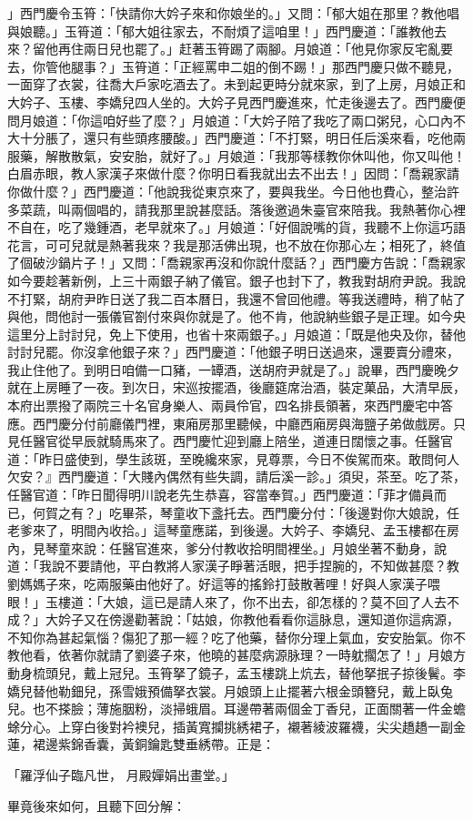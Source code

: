 \begin{showcontents}{}
」西門慶令玉筲：「快請你大妗子來和你娘坐的。」又問：「郁大姐在那里？教他唱與娘聽。」玉筲道：「郁大姐往家去，不耐煩了這咱里！」西門慶道：「誰教他去來？留他再住兩日兒也罷了。」赶著玉筲踢了兩腳。月娘道：「他見你家反宅亂要去，你管他腿事？」玉筲道：「正經罵申二姐的倒不踢！」那西門慶只做不聽見，一面穿了衣裳，往喬大戶家吃酒去了。未到起更時分就來家，到了上房，月娘正和大妗子、玉樓、李嬌兒四人坐的。大妗子見西門慶進來，忙走後邊去了。西門慶便問月娘道：「你這咱好些了麼？」月娘道：「大妗子陪了我吃了兩口粥兒，心口內不大十分脹了，還只有些頭疼腰酸。」西門慶道：「不打緊，明日任后溪來看，吃他兩服藥，解散散氣，安安胎，就好了。」月娘道：「我那等樣教你休叫他，你又叫他！白眉赤眼，教人家漢子來做什麼？你明日看我就出去不出去！」因問：「喬親家請你做什麼？」西門慶道：「他說我從東京來了，要與我坐。今日他也費心，整治許多菜蔬，叫兩個唱的，請我那里說甚麼話。落後邀過朱臺官來陪我。我熱著你心裡不自在，吃了幾鍾酒，老早就來了。」月娘道：「好個說嘴的貨，我聽不上你這巧語花言，可可兒就是熱著我來？我是那活佛出現，也不放在你那心左；相死了，終值了個破沙鍋片子！」又問：「喬親家再沒和你說什麼話？」西門慶方告說：「喬親家如今要趁著新例，上三十兩銀子納了儀官。銀子也封下了，教我對胡府尹說。我說不打緊，胡府尹昨日送了我二百本曆日，我還不曾回他禮。等我送禮時，稍了帖了與他，問他討一張儀官劄付來與你就是了。他不肯，他說納些銀子是正理。如今央這里分上討討兒，免上下使用，也省十來兩銀子。」月娘道：「既是他央及你，替他討討兒罷。你沒拿他銀子來？」西門慶道：「他銀子明日送過來，還要賣分禮來，我止住他了。到明日咱備一口豬，一罈酒，送胡府尹就是了。」說畢，西門慶晚夕就在上房睡了一夜。到次日，宋巡按擺酒，後廳筵席治酒，裝定菓品，大清早辰，本府出票撥了兩院三十名官身樂人、兩員伶官，四名排長領著，來西門慶宅中答應。西門慶分付前廳儀門裡，東廂房那里聽候，中廳西廂房與海鹽子弟做戲房。只見任醫官從早辰就騎馬來了。西門慶忙迎到廳上陪坐，道連日闊懷之事。任醫官道：「昨日盛使到，學生該斑，至晚纔來家，見尊票，今日不俟駕而來。敢問何人欠安？』西門慶道：「大賤內偶然有些失調，請后溪一診。」須臾，茶至。吃了茶，任醫官道：「昨日聞得明川說老先生恭喜，容當奉賀。」西門慶道：「菲才備員而已，何賀之有？」吃畢茶，琴童收下盞托去。西門慶分付：「後邊對你大娘說，任老爹來了，明間內收拾。」這琴童應諾，到後邊。大妗子、李嬌兒、孟玉樓都在房內，見琴童來說：任醫官進來，爹分付教收拾明間裡坐。」月娘坐著不動身，說道：「我說不要請他，平白教將人家漢子睜著活眼，把手捏腕的，不知做甚麼？教劉媽媽子來，吃兩服藥由他好了。好這等的搖鈴打鼓散著哩！好與人家漢子喂眼！」玉樓道：「大娘，這已是請人來了，你不出去，卻怎樣的？莫不回了人去不成？」大妗子又在傍邊勸著說：「姑娘，你教他看看你這脉息，還知道你這病源，不知你為甚起氣惱？傷犯了那一經？吃了他藥，替你分理上氣血，安安胎氣。你不教他看，依著你就請了劉婆子來，他曉的甚麼病源脉理？一時躭擱怎了！」月娘方動身梳頭兒，戴上冠兒。玉筲拏了鏡子，孟玉樓跳上炕去，替他拏抿子掠後鬢。李嬌兒替他勒鈿兒，孫雪娥預備拏衣裳。月娘頭上止擺著六根金頭簪兒，戴上臥兔兒。也不搽臉；薄施胭粉，淡掃蛾眉。耳邊帶著兩個金丁香兒，正面關著一件金蟾蜍分心。上穿白後對衿襖兒，插黃寬攔挑綉裙子，襯著綾波羅襪，尖尖趫趫一副金蓮，裙邊紫錦香囊，黃銅鑰匙雙垂綉帶。正是：

「羅浮仙子臨凡世，  月殿嬋娟出畫堂。」

畢竟後來如何，且聽下回分解：





\end{showcontents}


